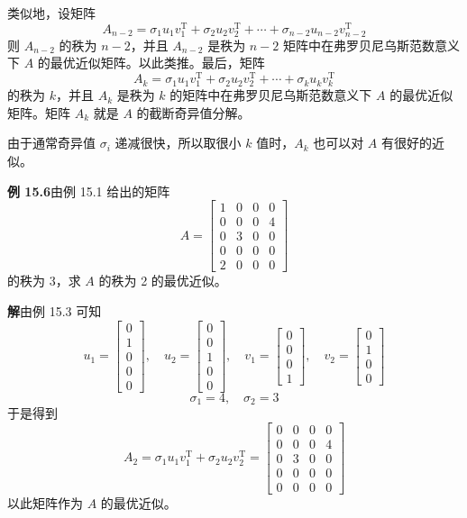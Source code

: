 \documentclass[UTF8, 12pt, fontset=fandol, oneside]{ctexart}
\begin{document}
类似地，设矩阵
\[
A_{n-2}=\sigma_1u_1v_1^{\mathrm{T}}+\sigma_2u_2v_2^{\mathrm{T}}+\cdots+\sigma_{n-2}u_{n-2}v_{n-2}^{\mathrm{T}}
\]
则 $A_{n-2}$ 的秩为 $n-2$，并且 $A_{n-2}$ 是秩为 $n-2$ 矩阵中在弗罗贝尼乌斯范数意义下 $A$ 的最优近似矩阵。以此类推。最后，矩阵
\[
A_k=\sigma_1u_1v_1^{\mathrm{T}}+\sigma_2u_2v_2^{\mathrm{T}}+\cdots+\sigma_ku_kv_k^{\mathrm{T}}
\]
的秩为 $k$，并且 $A_k$ 是秩为 $k$ 的矩阵中在弗罗贝尼乌斯范数意义下 $A$ 的最优近似矩阵。矩阵 $A_k$ 就是 $A$ 的截断奇异值分解。

由于通常奇异值 $\sigma_i$ 递减很快，所以取很小 $k$ 值时，$A_k$ 也可以对 $A$ 有很好的近似。

\noindent\textbf{例 15.6}\quad 由例 15.1 给出的矩阵
\[
A=
\begin{bmatrix}
1&0&0&0\\
0&0&0&4\\
0&3&0&0\\
0&0&0&0\\
2&0&0&0
\end{bmatrix}
\]
的秩为 3，求 $A$ 的秩为 2 的最优近似。

\noindent\textbf{解}\quad 由例 15.3 可知
\[
u_1=
\begin{bmatrix}
0\\1\\0\\0\\0
\end{bmatrix},\quad
u_2=
\begin{bmatrix}
0\\0\\1\\0\\0
\end{bmatrix},\quad
v_1=
\begin{bmatrix}
0\\0\\0\\1
\end{bmatrix},\quad
v_2=
\begin{bmatrix}
0\\1\\0\\0
\end{bmatrix}
\]
\[
\sigma_1=4,\quad\sigma_2=3
\]
于是得到
\[
A_2=\sigma_1u_1v_1^{\mathrm{T}}+\sigma_2u_2v_2^{\mathrm{T}}
=
\begin{bmatrix}
0&0&0&0\\
0&0&0&4\\
0&3&0&0\\
0&0&0&0\\
0&0&0&0
\end{bmatrix}
\]
以此矩阵作为 $A$ 的最优近似。
\end{document}
